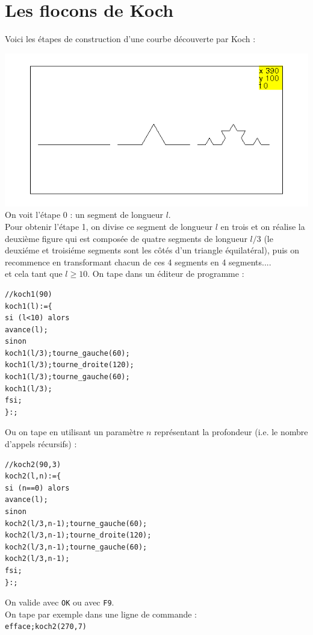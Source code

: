 \documentclass[a4paper,11pt]{book}
\begin{document}
\section{Les flocons de Koch}
Voici les \'etapes de construction d'une courbe 
d\'ecouverte par  Koch :

%
\includegraphics[width=\textwidth]{tortkoch}\\
On voit l'\'etape 0 : un segment de longueur $l$.\\
Pour obtenir l'\'etape 1, on divise ce segment de longueur $l$ en trois et on 
r\'ealise la deuxi\`eme figure qui est compos\'ee de quatre segments de 
longueur $l/3$ (le deuxi\'eme et troisi\'eme segments sont les c\^ot\'es d'un 
triangle \'equilat\'eral),
puis on recommence en transformant chacun de ces 4 segments en 4 segments....\\
et cela tant que $l \geq 10$.
On tape dans un \'editeur de programme :
\begin{verbatim}
//koch1(90)
koch1(l):={
si (l<10) alors
avance(l);
sinon
koch1(l/3);tourne_gauche(60);
koch1(l/3);tourne_droite(120);
koch1(l/3);tourne_gauche(60);
koch1(l/3);
fsi;
}:;
\end{verbatim}
Ou on tape en utilisant un param\`etre $n$ repr\'esentant la profondeur (i.e. 
le nombre d'appels r\'ecursifs) :
\begin{verbatim}
//koch2(90,3)
koch2(l,n):={
si (n==0) alors
avance(l);
sinon
koch2(l/3,n-1);tourne_gauche(60);
koch2(l/3,n-1);tourne_droite(120);
koch2(l/3,n-1);tourne_gauche(60);
koch2(l/3,n-1);
fsi;
}:;
\end{verbatim}
On valide avec {\tt OK} ou avec {\tt F9}.\\
On tape par exemple dans une ligne de commande :\\
{\tt efface;koch2(270,7)}\\
\end{document}
